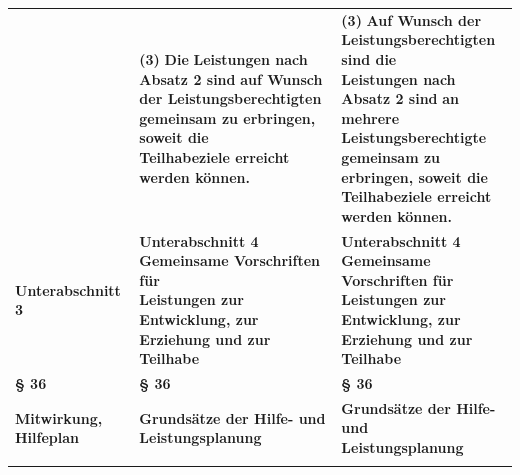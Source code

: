 \documentclass[10pt,a4paper,landscape]{article}
\begin{document}
\begin{longtable}{|L{8.2cm}|L{8.2cm}|L{8.2cm}|}
 & \textbf{(3) }\textbf{\textcolor{diffred}{Die}}\textbf{ Leistungen nach Absatz 2 sind} \newline \textbf{\textcolor{diffred}{auf Wunsch der Leistungsberechtigten}}\textbf{  \newline gemeinsam zu erbringen, soweit die  \newline Teilhabeziele erreicht werden können. } & \textbf{(3) }\textbf{\textcolor{diffgreen}{Auf Wunsch der  \newline Leistungsberechtigten sind die}}\textbf{  \newline Leistungen nach Absatz 2 sind }\textbf{\textcolor{diffgreen}{an  \newline mehrere Leistungsberechtigte}}\textbf{  \newline gemeinsam zu erbringen, soweit die  \newline Teilhabeziele erreicht werden können.  } \\
\hhline{|---|}
\textbf{Unterabschnitt }\textbf{\textcolor{diffred}{3}} & \textbf{Unterabschnitt 4   \newline Gemeinsame Vorschriften für  \newline Leistungen zur Entwicklung, zur  \newline Erziehung und zur Teilhabe } & \textbf{Unterabschnitt 4   \newline Gemeinsame Vorschriften für  \newline Leistungen zur Entwicklung, zur  \newline Erziehung und zur Teilhabe } \\
\hhline{|---|}
\textbf{\S{} 36} & \textbf{\S{} 36} & \textbf{\S{} 36} \\
\hhline{|---|}
\textbf{\textcolor{diffred}{Mitwirkung, Hilfeplan}} & \textbf{Grundsätze der Hilfe- und  \newline Leistungsplanung } & \textbf{Grundsätze der Hilfe- und  \newline Leistungsplanung } \\
\hhline{|---|}

\end{longtable}
\end{document}
